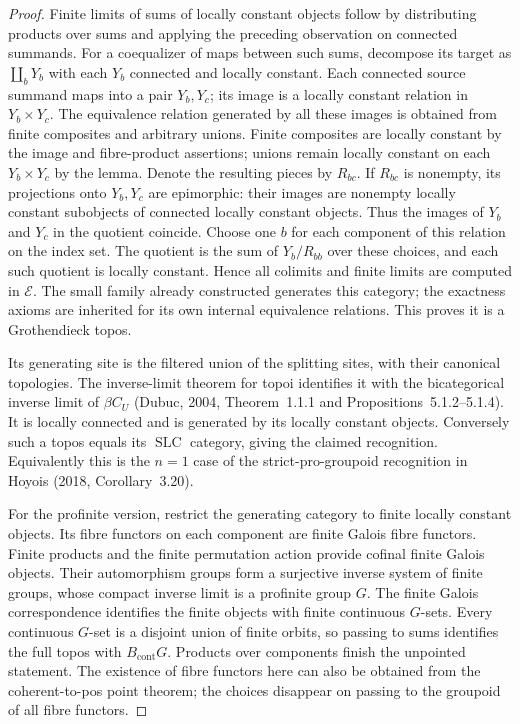 \begin{proof}
Finite limits of sums of locally constant objects follow by distributing products over sums and applying the preceding observation on connected summands. For a coequalizer of maps between such sums, decompose its target as $\coprod_bY_b$ with each $Y_b$ connected and locally constant. Each connected source summand maps into a pair $Y_b,Y_c$; its image is a locally constant relation in $Y_b\times Y_c$. The equivalence relation generated by all these images is obtained from finite composites and arbitrary unions. Finite composites are locally constant by the image and fibre-product assertions; unions remain locally constant on each $Y_b\times Y_c$ by the lemma. Denote the resulting pieces by $R_{bc}$. If $R_{bc}$ is nonempty, its projections onto $Y_b,Y_c$ are epimorphic: their images are nonempty locally constant subobjects of connected locally constant objects. Thus the images of $Y_b$ and $Y_c$ in the quotient coincide. Choose one $b$ for each component of this relation on the index set. The quotient is the sum of $Y_b/R_{bb}$ over these choices, and each such quotient is locally constant. Hence all colimits and finite limits are computed in $\mathcal E$. The small family already constructed generates this category; the exactness axioms are inherited for its own internal equivalence relations. This proves it is a Grothendieck topos.

Its generating site is the filtered union of the splitting sites, with their canonical topologies. The inverse-limit theorem for topoi identifies it with the bicategorical inverse limit of $\beta C_U$ (Dubuc, 2004, Theorem~1.1.1 and Propositions~5.1.2--5.1.4). It is locally connected and is generated by its locally constant objects. Conversely such a topos equals its $\operatorname{SLC}$ category, giving the claimed recognition. Equivalently this is the $n=1$ case of the strict-pro-groupoid recognition in Hoyois (2018, Corollary~3.20).

For the profinite version, restrict the generating category to finite locally constant objects. Its fibre functors on each component are finite Galois fibre functors. Finite products and the finite permutation action provide cofinal finite Galois objects. Their automorphism groups form a surjective inverse system of finite groups, whose compact inverse limit is a profinite group $G$. The finite Galois correspondence identifies the finite objects with finite continuous $G$-sets. Every continuous $G$-set is a disjoint union of finite orbits, so passing to sums identifies the full topos with $B_{\mathrm{cont}}G$. Products over components finish the unpointed statement. The existence of fibre functors here can also be obtained from the coherent-to-pos point theorem; the choices disappear on passing to the groupoid of all fibre functors. 
\end{proof}

